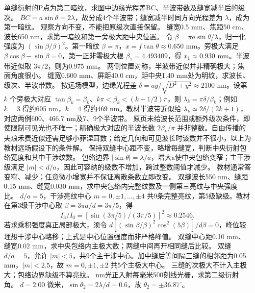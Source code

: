 \problemtext 单缝衍射的P点为第二暗纹，求图中边缘光程差BC、半波带数及缝宽减半后的级次。
\workings $BC=a\sin\theta=2\lambda$，故分成4个半波带；缝宽减半时同方向光程差为 $\lambda$，成为第一暗纹。
\crosscheck 观察方向不变，不能把原级次直接保留。
\problemtext 缝宽0.5 mm、焦距50 cm、波长650 nm，求第一暗纹和第一旁极大距中央位置。
\workings 令 $\beta=\pi a\sin\theta/\lambda$，归一化强度为 $(\sin\beta/\beta)^2$。第一暗纹 $\beta=\pi$，$x=f\tan\theta\approx0.650$ mm。旁极大满足 $\beta\cos\beta-\sin\beta=0$，第一正非零极大根 $\beta_1=4.493409$，得 $x_1\approx0.930$ mm。半波带近似取 $3\pi/2$，则为0.975 mm。
\crosscheck 两侧位置对称，半波带近似并非精确极大；焦面角度很小。
\problemtext 缝宽0.600 mm、屏距40.0 cm，距中央1.40 mm处为明纹，求波长、级次、半波带数。
\workings 按远场模型，边缘光程差 $\delta=ay/\sqrt{D^2+y^2}\approx2100$ nm。设第 $k$ 个旁极大对应 $\tan\beta_k=\beta_k$、$k\pi<\beta_k<(k+1/2)\pi$，则 $\lambda_k=\pi\delta/\beta_k$；例如 $k=3$ 得约605 nm，$k=4$ 得约469 nm。教材半波带近似给 $\lambda_k\simeq2\delta/(2k+1)$，对应两例600、466.7 nm及7、9个半波带。
\crosscheck 原页未给波长范围或额外级次条件，即使限制可见光也不唯一；精确极大对应的半波长数 $2\beta_k/\pi$ 并非整数。自由传播的夫琅禾费近似还需足够小菲涅耳数；给定几何和可见波长时该数并不很小，以上为教材远场假设下的条件解。
\problemtext 保持双缝中心距不变，略增每缝宽，判断中央衍射包络宽度和其中干涉纹数。
\workings 包络边界 $|\sin\theta|=\lambda/a$，增大a使中央包络变窄；主干涉级满足 $|m|<d/a$，因此可容纳的级数不增加，跨过整数阈值才减少。
\crosscheck 教材通常答变窄、减少；任意微小增宽并不保证离散条数立即改变。
\problemtext 双缝波长550 nm、缝距0.15 mm、缝宽0.030 mm，求中央包络内完整纹数及一侧第三亮纹与中央强度比。
\workings $d/a=5$，干涉亮纹中心 $m=0,\pm1,\ldots,\pm4$ 共9条完整亮纹，第5级缺级。教材在第3级干涉中心取 $\beta=3\pi a/d=3\pi/5$，得
\[
I_3/I_0=[\sin(3\pi/5)/(3\pi/5)]^2\approx0.2546.
\]
\crosscheck 若求乘积强度真正局部极大，须令 $d[(\sin\beta/\beta)^2\cos^2(5\beta)]/d\beta=0$，峰位较理想干涉中心略移；上式是中心位置强度而非严格峰值。
\problemtext 双缝中心距0.10 mm、缝宽0.02 mm，求中央包络内主极大数；两缝中间再开相同缝后比较。
\workings 双缝 $d/a=5$，允许 $|m|<5$，共9个主干涉中心。加中缝后等间隔三缝的相邻距为0.05 mm，$|m|<2.5$，故 $m=0,\pm1,\pm2$ 共5个主极大中心。
\crosscheck 三缝的次极大不计入主极大；包络边界缺级不算亮纹。
 nm光正入射每毫米500刻线光栅，求第二级衍射角。
\workings $d=2.00$ 微米，$\sin\theta_2=2\lambda/d=0.6$，故 $\theta_2=\pm36.87^\circ$。
